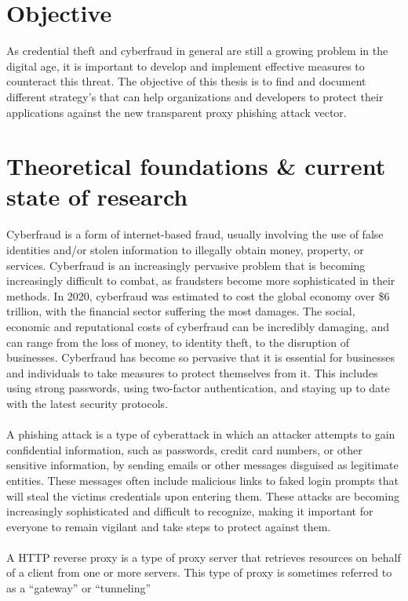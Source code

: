 \documentclass[12pt]{report}
\begin{document}
\section{Objective}
As credential theft and cyberfraud in general are still a growing problem in
the digital age, it is important to develop and implement effective measures to
counteract this threat. The objective of this thesis is to find and document
different strategy's that can help organizations and developers to protect their
applications against the new transparent proxy phishing attack vector.

\section{Theoretical foundations \& current state of research}
Cyberfraud is a form of internet-based fraud, usually involving the use of false
identities and/or stolen information to illegally obtain money, property, or services.
Cyberfraud is an increasingly pervasive problem that is becoming increasingly
difficult to combat, as fraudsters become more sophisticated in their methods.
In 2020, cyberfraud was estimated to cost the global economy over \$6 trillion\cite{6trillion},
with the financial sector suffering the most damages. The social, economic and
reputational costs of cyberfraud can be incredibly damaging, and can range from
the loss of money, to identity theft, to the disruption of businesses.
Cyberfraud has become so pervasive that it is essential for businesses and
individuals to take measures to protect themselves from it. This includes using
strong passwords, using two-factor authentication, and staying up to date with
the latest security protocols. \\ \\ A phishing attack is a type of
cyberattack in which an attacker attempts to gain confidential information, such
as passwords, credit card numbers, or other sensitive information, by sending
emails or other messages disguised as legitimate entities. These messages often
include malicious links to faked login prompts that will steal the victims credentials
upon entering them. These attacks are becoming increasingly sophisticated and
difficult to recognize, making it important for everyone to remain vigilant and
take steps to protect against them. \\ \\ A HTTP reverse proxy is a type of
proxy server that retrieves resources on behalf of a client from one or more
servers. This type of proxy is sometimes referred to as a “gateway” or “tunneling”
\end{document}
